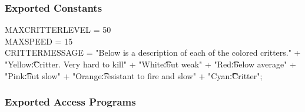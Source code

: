 \documentclass[12,english]{article}
\begin{document}
	    \subsubsection{Exported Constants}
	    MAXCRITTERLEVEL = 50\\
	    MAXSPEED = 15\\
	    CRITTERMESSAGE = "Below is a description of each of the colored critters.\n\n" + "Yellow:\t\t\tBoss Critter. Very hard to kill\n\n" + "White:\t\t\tFast but weak\n\n" + "Red:\t\t\tSlightly below average\n\n" + "Pink:\t\t\tStrong but slow\n\n" + "Orange:\t\t\tCompletely resistant to fire and slow\n\n" + "Cyan:\t\t\tAverage Critter\n\n";  \\
		\subsubsection{Exported Access Programs}
\end{document}
